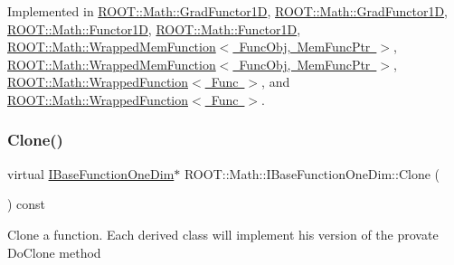 Implemented in \mbox{\hyperlink{classROOT_1_1Math_1_1GradFunctor1D_ab8280aaf240a374fb7a67808d858af79}{R\+O\+O\+T\+::\+Math\+::\+Grad\+Functor1D}}, \mbox{\hyperlink{classROOT_1_1Math_1_1GradFunctor1D_ab8280aaf240a374fb7a67808d858af79}{R\+O\+O\+T\+::\+Math\+::\+Grad\+Functor1D}}, \mbox{\hyperlink{classROOT_1_1Math_1_1Functor1D_af77ece084fc56e41c06e32e0f78a88a9}{R\+O\+O\+T\+::\+Math\+::\+Functor1D}}, \mbox{\hyperlink{classROOT_1_1Math_1_1Functor1D_af77ece084fc56e41c06e32e0f78a88a9}{R\+O\+O\+T\+::\+Math\+::\+Functor1D}}, \mbox{\hyperlink{classROOT_1_1Math_1_1WrappedMemFunction_a6f27e92240e16003ff20c25df6fba1eb}{R\+O\+O\+T\+::\+Math\+::\+Wrapped\+Mem\+Function$<$ Func\+Obj, Mem\+Func\+Ptr $>$}}, \mbox{\hyperlink{classROOT_1_1Math_1_1WrappedMemFunction_a6f27e92240e16003ff20c25df6fba1eb}{R\+O\+O\+T\+::\+Math\+::\+Wrapped\+Mem\+Function$<$ Func\+Obj, Mem\+Func\+Ptr $>$}}, \mbox{\hyperlink{classROOT_1_1Math_1_1WrappedFunction_a4ec89f0c717b0fc228ebe7d71e14b1ee}{R\+O\+O\+T\+::\+Math\+::\+Wrapped\+Function$<$ Func $>$}}, and \mbox{\hyperlink{classROOT_1_1Math_1_1WrappedFunction_a4ec89f0c717b0fc228ebe7d71e14b1ee}{R\+O\+O\+T\+::\+Math\+::\+Wrapped\+Function$<$ Func $>$}}.

\mbox{\label{classROOT_1_1Math_1_1IBaseFunctionOneDim_a656dbb4dfc43e8d1566442bfb1a717fd}} 
\subsubsection{\texorpdfstring{Clone()}{Clone()}\hspace{0.1cm}{\footnotesize\ttfamily [2/2]}}
{\footnotesize\ttfamily virtual \mbox{\hyperlink{classROOT_1_1Math_1_1IBaseFunctionOneDim}{I\+Base\+Function\+One\+Dim}}$\ast$ R\+O\+O\+T\+::\+Math\+::\+I\+Base\+Function\+One\+Dim\+::\+Clone (\begin{DoxyParamCaption}{ }\end{DoxyParamCaption}) const\hspace{0.3cm}{\ttfamily [pure virtual]}}

Clone a function. Each derived class will implement his version of the provate Do\+Clone method 

